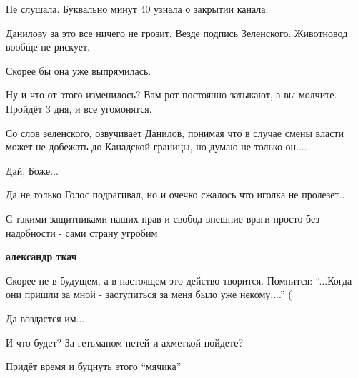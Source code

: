 \begin{itemize}
Не слушала. Буквально минут 40 узнала о закрытии канала.

Данилову за это все ничего не грозит. Везде подпись Зеленского. Животновод вообще не рискует.

Скорее бы она уже выпрямилась.

Ну и что от этого изменилось? Вам рот постоянно затыкают, а вы молчите. Пройдёт 3 дня, и все угомонятся.

Со слов зеленского, озвучивает Данилов, понимая что в случае смены власти может
не добежать до Канадской границы, но думаю не только он....

Дай, Боже...

Да не только Голос подрагивал, но и очечко сжалось что иголка не пролезет..

С такими защитниками наших прав и свобод внешние враги просто без надобности -
сами страну угробим

\textbf{александр ткач} 

Скорее не в будущем, а в настоящем это действо творится. Помнится: \enquote{...Когда
они пришли за мной - заступиться за меня было уже некому....} (

Да воздастся им...

И что будет? За гетьманом петей и ахметкой пойдете?

Придёт время и буцнуть этого \enquote{мячика}

\end{itemize} %

